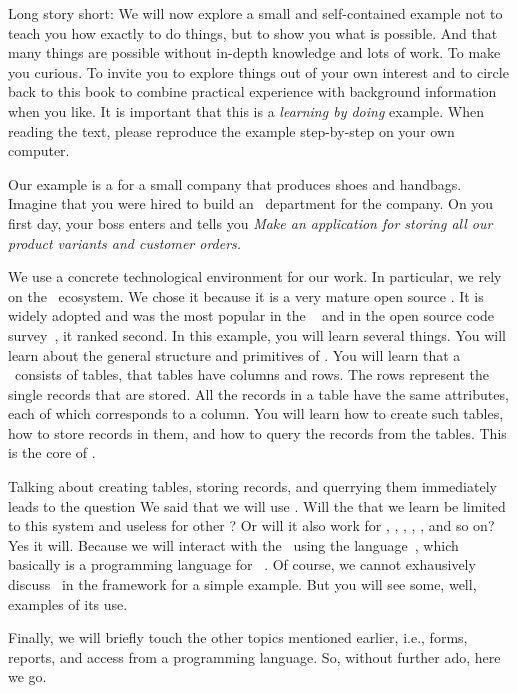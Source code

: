 Long story short:
We will now explore a small and self-contained example not to teach you how exactly to do things, but to show you what is possible.
And that many things are possible without in-depth knowledge and lots of work.
To make you curious.
To invite you to explore things out of your own interest and to circle back to this book to combine practical experience with background information when you like.
It is important that this is a \emph{learning by doing} example.
When reading the text, please reproduce the example step-by-step on your own computer.

Our example is a  for a small company that produces shoes and handbags.
Imagine that you were hired to build an ~department for the company.
On you first day, your boss enters and tells you \emph{Make an application for storing all our product variants and customer orders.}

We use a concrete technological environment for our work.
In particular, we rely on the \postgresql\ ecosystem.
We chose it because it is a very mature open source .
It is widely adopted and was the most popular  in the ~\cite{SE:SO:2024DS} and in the open source code survey~\cite{PMPVEPWGSMB2025ATAODMSTTHOOSP}, it ranked second.%
%
%
%
In this example, you will learn several things.
You will learn about the general structure and primitives of .
You will learn that a \db\ consists of tables, that tables have columns and rows.
The rows represent the single records that are stored.
All the records in a table have the same attributes, each of which corresponds to a column.
You will learn how to create such tables, how to store records in them, and how to query the records from the tables.
This is the core of .

Talking about creating tables, storing records, and querrying them immediately leads to the question \emph{}
We said that we will use \postgresql.
Will the \emph{} that we learn be limited to this system and useless for other ?
Or will it also work for \mariadb, \microsoftSqlServer, \oracleDB, \mysql, \sqlite, and so on?
Yes it will.
Because we will interact with the \db\ using the language~\sql, which basically is a programming language for ~\cite{C20245YOQ,MS2001S1URLC,PGDG:PD:SC,SP2002STYSI2D,SPMP1998SI2TDDASVEI12T,T2018ISARD,ANSIX3135,DB2019HTTPS,ISO90751987,ISOIEC9707112023E}.
Of course, we cannot exhausively discuss \sql\ in the framework for a simple example.
But you will see some, well, examples of its use.

Finally, we will briefly touch the other topics mentioned earlier, i.e., forms, reports, and access from a programming language.
So, without further ado, here we go.
